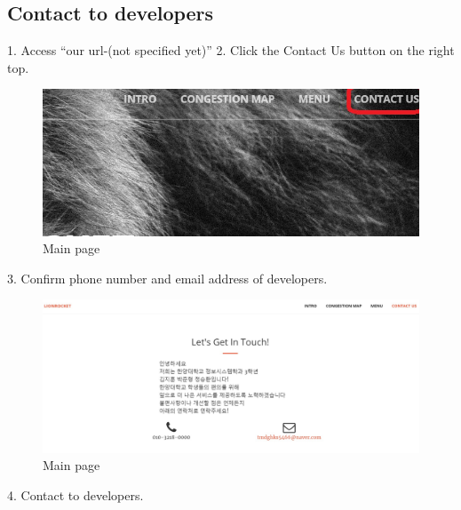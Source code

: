 \documentclass[journal]{IEEEtran}
\begin{document}

\subsection{Contact to developers}
1. Access “our url-(not specified yet)”
2. Click the Contact Us button on the right top.
\begin{figure}[h]
\centering
\includegraphics[scale=0.3]{F1.jpg}
\caption{Main page}
\label{fig:congestion button}
\end{figure}




3. Confirm phone number and email address of developers.    
\begin{figure}[h]
\centering
\includegraphics[scale=0.2]{F2.jpg}
\caption{Main page}
\label{fig:congestion button}
\end{figure}

4. Contact to developers.
\end{document}
